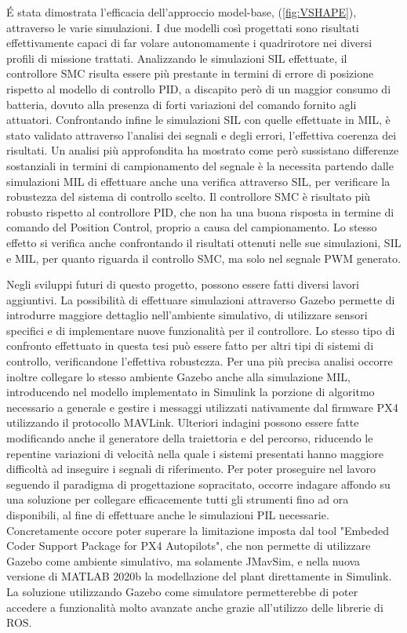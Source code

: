 \'E stata dimostrata l'efficacia dell'approccio model-base, (\ref{fig:VSHAPE}), attraverso le varie simulazioni. I due modelli così progettati sono risultati effettivamente capaci di far volare autonomamente i quadrirotore nei diversi profili di missione trattati. Analizzando le simulazioni SIL effettuate, il controllore SMC risulta essere più prestante in termini di errore di posizione rispetto al modello di controllo PID, a discapito però di un maggior consumo di batteria, dovuto alla presenza di forti variazioni del comando fornito agli attuatori. Confrontando infine le simulazioni SIL con quelle effettuate in MIL, è stato validato attraverso l'analisi dei segnali e degli errori, l'effettiva coerenza dei risultati. Un analisi più approfondita ha mostrato come però sussistano differenze sostanziali in termini di campionamento del segnale è la necessita partendo dalle simulazioni MIL di effettuare anche una verifica attraverso SIL, per verificare la robustezza del sistema di controllo scelto. Il controllore SMC è risultato più robusto rispetto al controllore PID, che non ha una buona risposta in termine di comando del Position Control, proprio a causa del campionamento. Lo stesso effetto si verifica anche confrontando il risultati ottenuti nelle sue simulazioni, SIL e MIL, per quanto riguarda il controllo SMC, ma solo nel segnale PWM generato.

Negli sviluppi futuri di questo progetto, possono essere fatti diversi lavori aggiuntivi. La possibilità di effettuare simulazioni attraverso Gazebo permette di introdurre maggiore dettaglio nell'ambiente simulativo, di utilizzare sensori specifici e di implementare nuove funzionalità per il controllore. Lo stesso tipo di confronto effettuato in questa tesi può essere fatto per altri tipi di sistemi di controllo, verificandone l'effettiva robustezza. Per una più precisa analisi occorre inoltre collegare lo stesso ambiente Gazebo anche alla simulazione MIL, introducendo nel modello implementato in Simulink la porzione di algoritmo necessario a generale e gestire i messaggi utilizzati nativamente dal firmware PX4 utilizzando il protocollo MAVLink. Ulteriori indagini possono essere fatte modificando anche il generatore della traiettoria e del percorso, riducendo le repentine variazioni di velocità nella quale i sistemi presentati hanno maggiore difficoltà ad inseguire i segnali di riferimento. Per poter proseguire nel lavoro seguendo il paradigma di progettazione sopracitato, occorre indagare affondo su una soluzione per collegare efficacemente tutti gli strumenti fino ad ora disponibili, al fine di effettuare anche le simulazioni PIL necessarie. Concretamente occore poter superare la limitazione imposta dal tool "Embeded Coder Support Package for PX4 Autopilots", che non permette di utilizzare Gazebo come ambiente simulativo, ma solamente JMavSim, e nella nuova versione di MATLAB 2020b la modellazione del plant direttamente in Simulink. La soluzione utilizzando Gazebo come simulatore permetterebbe di poter accedere a funzionalità molto avanzate anche grazie all'utilizzo delle librerie di ROS. 